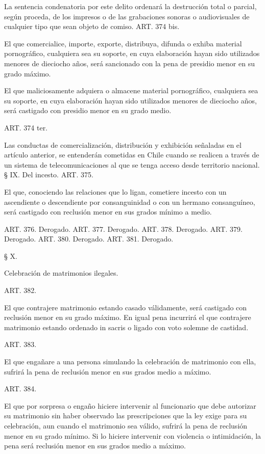     La sentencia condenatoria por este delito ordenará la destrucción total o parcial, según proceda, de los impresos o de las grabaciones sonoras o audiovisuales de cualquier tipo que sean objeto de comiso.
    ART. 374 bis.

    El que comercialice, importe, exporte, distribuya, difunda o exhiba material pornográfico, cualquiera sea su soporte, en cuya elaboración hayan sido utilizados menores de dieciocho años, será sancionado con la pena de presidio menor en su grado máximo.

    El que maliciosamente adquiera o almacene material pornográfico, cualquiera sea su soporte, en cuya elaboración hayan sido utilizados menores de dieciocho años, será castigado con presidio menor en su grado medio.

    ART. 374 ter.

    Las conductas de comercialización, distribución y exhibición señaladas en el artículo anterior, se entenderán cometidas en Chile cuando se realicen a través de un sistema de telecomunicaciones al que se tenga acceso desde territorio nacional.
    § IX. Del incesto.
    ART. 375.

    El que, conociendo las relaciones que lo ligan, cometiere incesto con un ascendiente o descendiente por consanguinidad o con un hermano consanguíneo, será castigado con reclusión menor en sus grados mínimo a medio.

    ART. 376. Derogado.
    ART. 377. Derogado.
    ART. 378. Derogado.
    ART. 379. Derogado.
    ART. 380. Derogado.
    ART. 381. Derogado.


    § X.

    Celebración de matrimonios ilegales.





    ART. 382.

    El que contrajere matrimonio estando casado válidamente, será castigado con reclusión menor en su grado máximo.
    En igual pena incurrirá el que contrajere matrimonio estando ordenado in sacris o ligado con voto solemne de castidad.

    ART. 383.

    El que engañare a una persona simulando la celebración de matrimonio con ella, sufrirá la pena de reclusión menor en sus grados medio a máximo.



    ART. 384.

    El que por sorpresa o engaño hiciere intervenir al funcionario que debe autorizar su matrimonio sin haber observado las prescripciones que la ley exige para su celebración, aun cuando el matrimonio sea válido, sufrirá la pena de reclusión menor en su grado mínimo.
    Si lo hiciere intervenir con violencia o intimidación, la pena será reclusión menor en sus grados medio a máximo.

